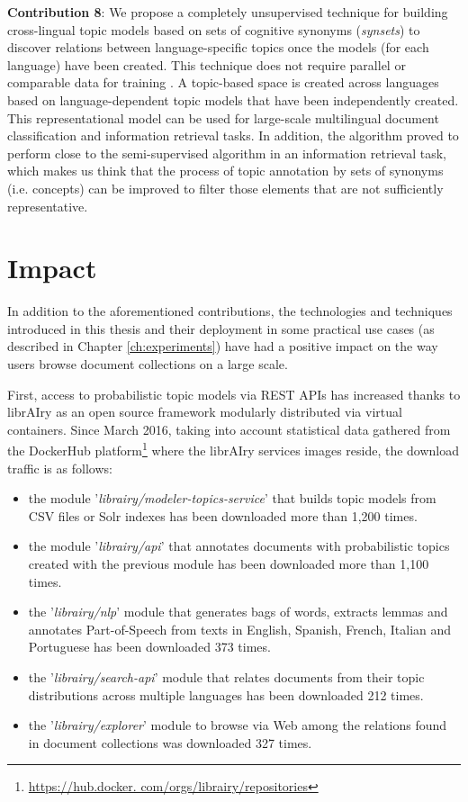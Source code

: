 \textbf{Contribution 8}: We propose a completely unsupervised technique for building cross-lingual topic models based on sets of cognitive synonyms (\textit{synsets}) \citep{Miller1995WordNet:English} to discover relations between language-specific topics once the models (for each language) have been created. This technique does not require parallel or comparable data for training \citep{Badenes-Olmedo2019, Badenes-Olmedo2019b}. A topic-based space is created across languages based on language-dependent topic models that have been independently created. This representational model can be used for large-scale multilingual document classification and information retrieval tasks. In addition, the algorithm proved to perform close to the semi-supervised algorithm in an information retrieval task, which makes us think that the process of topic annotation by sets of synonyms (i.e. concepts) can be improved to filter those elements that are not sufficiently representative.


\section{Impact}

In addition to the aforementioned contributions, the technologies and techniques introduced in this thesis and their deployment in some practical use cases (as described in Chapter \ref{ch:experiments}) have had a positive impact on the way users browse document collections on a large scale.

First, access to probabilistic topic models via REST APIs has increased thanks to librAIry as an open source framework modularly distributed via virtual containers. Since March 2016, taking into account statistical data gathered from the DockerHub platform\footnote{\url{https://hub.docker. com/orgs/librairy/repositories}} where the librAIry services images reside, the download traffic is as follows:
\begin{itemize}
\item the module '\textit{librairy/modeler-topics-service}' that builds topic models from CSV files or Solr indexes has been downloaded more than 1,200 times.
\item the module '\textit{librairy/api}' that annotates documents with probabilistic topics created with the previous module has been downloaded more than 1,100 times.
\item the '\textit{librairy/nlp}' module that generates bags of words, extracts lemmas and annotates Part-of-Speech from texts in English, Spanish, French, Italian and Portuguese has been downloaded 373 times.
\item the '\textit{librairy/search-api}' module that relates documents from their topic distributions across multiple languages has been downloaded 212 times.
\item the '\textit{librairy/explorer}' module to browse via Web among the relations found in document collections was downloaded 327 times.
\end{itemize}

